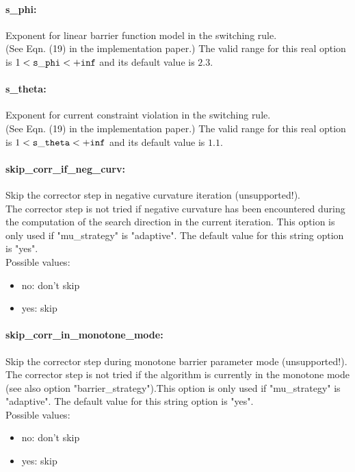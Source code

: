 \paragraph{s\_phi:}\label{sec:s_phi} Exponent for linear barrier function model in the switching rule. $\;$ \\
 (See Eqn. (19) in the implementation paper.) The valid range for this real option is 
$1 <  {\tt s\_phi } <  {\tt +inf}$
and its default value is $2.3$.


\paragraph{s\_theta:}\label{sec:s_theta} Exponent for current constraint violation in the switching rule. $\;$ \\
 (See Eqn. (19) in the implementation paper.) The valid range for this real option is 
$1 <  {\tt s\_theta } <  {\tt +inf}$
and its default value is $1.1$.


\paragraph{skip\_corr\_if\_neg\_curv:}\label{sec:skip_corr_if_neg_curv} Skip the corrector step in negative curvature iteration (unsupported!). $\;$ \\
 The corrector step is not tried if negative
curvature has been encountered during the
computation of the search direction in the
current iteration. This option is only used if
"mu\_strategy" is "adaptive".
The default value for this string option is "yes".
\\ 
Possible values:
\begin{itemize}
   \item no: don't skip
   \item yes: skip
\end{itemize}

\paragraph{skip\_corr\_in\_monotone\_mode:}\label{sec:skip_corr_in_monotone_mode} Skip the corrector step during monotone barrier parameter mode (unsupported!). $\;$ \\
 The corrector step is not tried if the algorithm
is currently in the monotone mode (see also
option "barrier\_strategy").This option is only
used if "mu\_strategy" is "adaptive".
The default value for this string option is "yes".
\\ 
Possible values:
\begin{itemize}
   \item no: don't skip
   \item yes: skip
\end{itemize}

